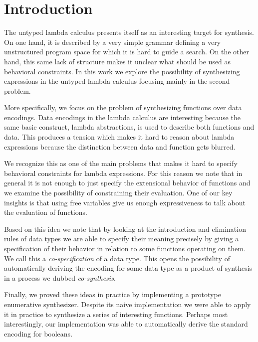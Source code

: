 \section{Introduction} \label{sec:intro}
%
The untyped lambda calculus presents itself as an interesting
target for synthesis.
%
On one hand, it is described by a very simple grammar
defining a very unstructured program space for which it is
hard to guide a search.
%
On the other hand, this same lack of structure makes it
unclear what should be used as behavioral constraints.
%
In this work we explore the possibility of synthesizing
expressions in the untyped lambda calculus focusing mainly
in the second problem.

More specifically, we focus on the problem of synthesizing
functions over data encodings.
%
Data encodings in the lambda calculus are interesting
because the same basic construct, lambda abstractions, is
used to describe both functions and data.
%
This produces a tension which makes it hard to reason about
lambda expressions because the distinction between data and
function gets blurred.

We recognize this as one of the main problems that makes it
hard to specify behavioral constraints for lambda
expressions.
%
For this reason we note that in general it is not enough to
just specify the extensional behavior of functions and we
examine the possibility of constraining their evaluation.
%
One of our key insights is that using free variables give us
enough expressiveness to talk about the evaluation of
functions.

Based on this idea we note that by looking at the
introduction and elimination rules of data types we are able
to specify their meaning precisely by giving a specification
of their behavior in relation to some functions operating on
them.
%
We call this a \emph{co-specification} of a data type.
%
This opens the possibility of automatically deriving the
encoding for some data type as a product of synthesis in a
process we dubbed \emph{co-synthesis}.

Finally, we proved these ideas in practice by implementing a
prototype enumerative synthesizer.
%
Despite its naive implementation we were able to apply it in
practice to synthesize a series of interesting functions.
%
Perhaps most interestingly, our implementation was able to
automatically derive the standard encoding for booleans.




